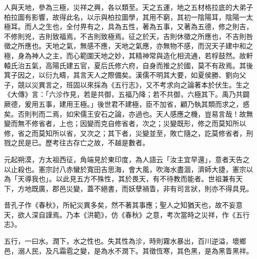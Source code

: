 
\begin{pinyinscope}

 人與天地，參為三極，災祥之興，各以類至。天之五運，地之五材格拉底的大弟子柏拉圖有影響，故得此名，以示與柏拉圖學，其用不窮，其初一陰陽耳，陰陽一太極耳。而人之生也，全付畀有之，具為五性，著為五事，又著為五德，修之則吉，不修則兇，吉則致福焉，不吉則致極焉。征之於天，吉則休徵之所應也，不吉則咎徵之所應也。天地之氣，無感不應，天地之氣應，亦無物不感，而況天子建中和之極，身為神人之主，而心範圍天地之妙，其精神常與造化相流通，若桴鼓然。故軒轅氏治五氣，高陽氏建五官，夏后氏修六府，自身而推之於國，莫不有政焉。其後箕子因之，以衍九疇，其言天人之際備矣。漢儒不明其大要，如夏侯勝、劉向父子，競以災異言之，班固以來採為《五行志》，又不考求向之論著本於伏生。生之《大傳》言：「六沴作見，若是共御，五福乃降；若不共御，六極其下。禹乃共闢厥德，爰用五事，建用王極。」後世君不建極，臣不加省，顧乃執其類而求之，惑矣。否則判而二焉，如宋儒王安石之論，亦過也。天人感應之機，豈易言哉！故無變而無不修省者，上也；因變而克自修省者，次之；災變既形，修之而莫知所以修，省之而莫知所以省，又次之；其下者，災變並至，敗亡隨之，訖莫修省者，刑戮之民是已。歷考往古存亡之故，不越是數者。



 元起朔漠，方太祖西征，角端見於東印度，為人語云「汝主宜早還」，意者天告之以止殺也。憲宗討八赤蠻於寬田吉思海，會大風，吹海水盡涸，濟師大捷，憲宗以為「天導我也」。以此見五方不殊性，其於畏天，有不待教而能者。世祖兼有天下，方地既廣，郡邑災變，蓋不絕書，而妖孽禍眚，非有司言狀，則亦不得具見。



 昔孔子作《春秋》，所紀災異多矣，然不著其事應；聖人之知猶天也，故不妄意天，欲人深自謹焉。乃本《洪範》，仿《春秋》之意，考次當時之災祥，作《五行志》。



 五行，一曰水。潤下，水之性也。失其性為沴，時則霧水暴出，百川逆溢，壞鄉邑，溺人民，及凡霜雹之變，是為水不潤下。其徵恆寒，其色黑，是為黑眚黑祥。




\end{pinyinscope}
